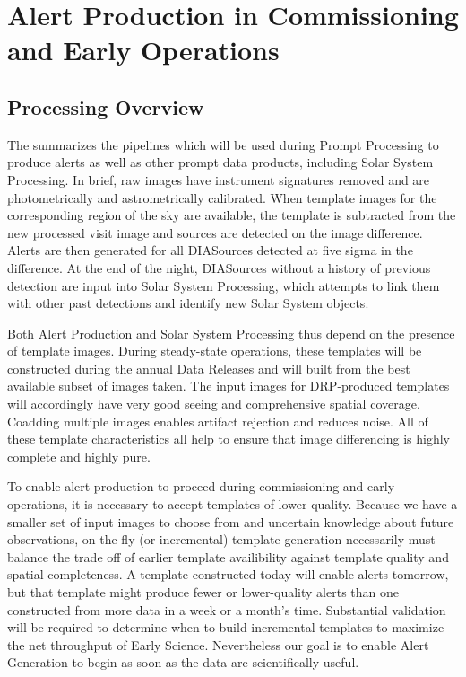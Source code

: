 \section{Alert Production in Commissioning and Early Operations}
\label{sec:pp}

\subsection{Processing Overview}

The \DPDD{} summarizes the pipelines which will be used during Prompt Processing to produce alerts as well as other prompt data products, including Solar System Processing.
In brief, raw images have instrument signatures removed and are photometrically and astrometrically calibrated.
When template images for the corresponding region of the sky are available, the template is subtracted from the new processed visit image and sources are detected on the image difference.
Alerts are then generated for all DIASources detected at five sigma in the difference.
At the end of the night, DIASources without a history of previous detection are input into Solar System Processing, which attempts to link them with other past detections and identify new Solar System objects.

Both Alert Production and Solar System Processing thus depend on the presence of template images.
During steady-state operations, these templates will be constructed during the annual Data Releases and will built from the best available subset of images taken.
The input images for DRP-produced templates will accordingly have very good seeing and  comprehensive spatial coverage.
Coadding multiple images enables artifact rejection   and reduces noise.
All of these template characteristics all help to ensure that image differencing is highly complete and highly pure.

To enable alert production to proceed during commissioning and early operations, it is necessary to accept templates of lower quality.
Because we have a smaller set of input images to choose from and uncertain knowledge about future observations, on-the-fly (or incremental) template generation necessarily must balance the trade off of earlier template availibility against template quality and spatial completeness. 
A template constructed today will enable alerts tomorrow, but that template might produce fewer or lower-quality alerts than one constructed from more data in a week or a month's time.
Substantial validation will be required to determine when to build incremental templates to maximize the net throughput of Early Science.
Nevertheless our goal is to enable Alert Generation to begin as soon as the data are scientifically useful.

